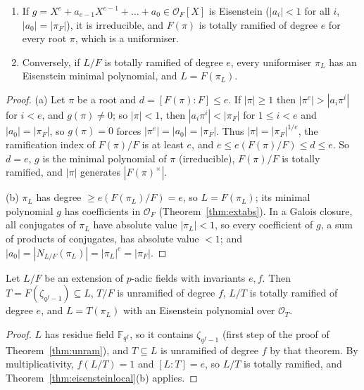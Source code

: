 \begin{theorem}[Eisenstein]\label{thm:eisensteinlocal}
\begin{enumerate}[label=(\alph*)]
\item If $g=X^e+a_{e-1}X^{e-1}+\dots+a_0\in\mathcal O_F[X]$ is Eisenstein ($|a_i|<1$ for all $i$, $|a_0|=|\pi_F|$), it is
irreducible, and $F(\pi)$ is totally ramified of degree $e$ for every root $\pi$, which is a uniformiser.
\item Conversely, if $L/F$ is totally ramified of degree $e$, every uniformiser $\pi_L$ has an Eisenstein minimal polynomial,
and $L=F(\pi_L)$.
\end{enumerate}
\end{theorem}
\begin{proof}
(a) Let $\pi$ be a root and $d=[F(\pi):F]\le e$. If $|\pi|\ge1$ then $|\pi^e|>|a_i\pi^i|$ for $i<e$, and $g(\pi)\ne0$; so
$|\pi|<1$, then $|a_i\pi^i|<|\pi_F|$ for $1\le i<e$ and $|a_0|=|\pi_F|$, so $g(\pi)=0$ forces $|\pi^e|=|a_0|=|\pi_F|$. Thus
$|\pi|=|\pi_F|^{1/e}$, the ramification index of $F(\pi)/F$ is at least $e$, and $e\le e(F(\pi)/F)\le d\le e$. So $d=e$, $g$ is
the minimal polynomial of $\pi$ (irreducible), $F(\pi)/F$ is totally ramified, and $|\pi|$ generates $|F(\pi)^\times|$.

(b) $\pi_L$ has degree $\ge e(F(\pi_L)/F)=e$, so $L=F(\pi_L)$; its minimal polynomial $g$ has coefficients in $\mathcal O_F$
(Theorem~\ref{thm:extabs}). In a Galois closure, all conjugates of $\pi_L$ have absolute value $|\pi_L|<1$, so every
coefficient of $g$, a sum of products of conjugates, has absolute value $<1$; and $|a_0|=|N_{L/F}(\pi_L)|=|\pi_L|^e=|\pi_F|$.
\end{proof}

\begin{proposition}\label{prop:tower}
Let $L/F$ be an extension of $p$-adic fields with invariants $e,f$. Then $T=F(\zeta_{q^f-1})\subseteq L$, $T/F$ is unramified of
degree $f$, $L/T$ is totally ramified of degree $e$, and $L=T(\pi_L)$ with an Eisenstein polynomial over $\mathcal O_T$.
\end{proposition}
\begin{proof}
$L$ has residue field $\mathbb F_{q^f}$, so it contains $\zeta_{q^f-1}$ (first step of the proof of Theorem~\ref{thm:unram}), and
$T\subseteq L$ is unramified of degree $f$ by that theorem. By multiplicativity, $f(L/T)=1$ and $[L:T]=e$, so $L/T$ is totally
ramified, and Theorem~\ref{thm:eisensteinlocal}(b) applies.
\end{proof}

